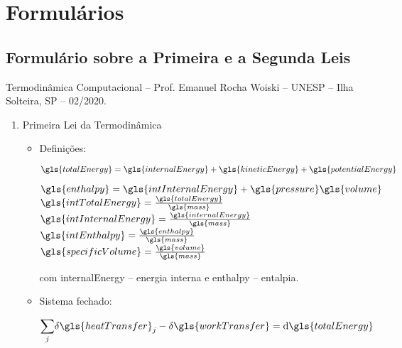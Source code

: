 \chapter*{Formulários}

    \section*{Formulário sobre a Primeira e a Segunda Leis}

    Termodinâmica Computacional -- Prof. Emanuel Rocha Woiski -- UNESP -- Ilha
    Solteira, SP -- 02/2020.

    \begin{enumerate}
        \item Primeira Lei da Termodinâmica

        \begin{itemize}
            \item Definições:

                $
                    \gls{totalEnergy}
                    =
                    \gls{internalEnergy}
                    +
                    \gls{kineticEnergy}
                    +
                    \gls{potentialEnergy}
                $

                $
                    \gls{enthalpy}
                    =
                    \gls{intInternalEnergy}
                    +
                    \gls{pressure}
                    \gls{volume}
                $
                $\gls{intTotalEnergy} = \frac{\gls{totalEnergy}}{\gls{mass}}$
                $\gls{intInternalEnergy} = \frac{\gls{internalEnergy}}{\gls{mass}}$
                $\gls{intEnthalpy} = \frac{\gls{enthalpy}}{\gls{mass}}$
                $\gls{specificVolume} = \frac{\gls{volume}}{\gls{mass}}$

            com \gls{internalEnergy} -- energia interna e \gls{enthalpy} --
            entalpia.

            \item Sistema fechado:

                \begin{equation*}
                    \underset{j}{\sum }{%
                        \idiff{\gls{heatTransfer}}_j
                    }
                    -
                    \idiff{\gls{workTransfer}}
                    =
                    \diff{\gls{totalEnergy}}
                \end{equation*}


\end{itemize}
\end{enumerate}
